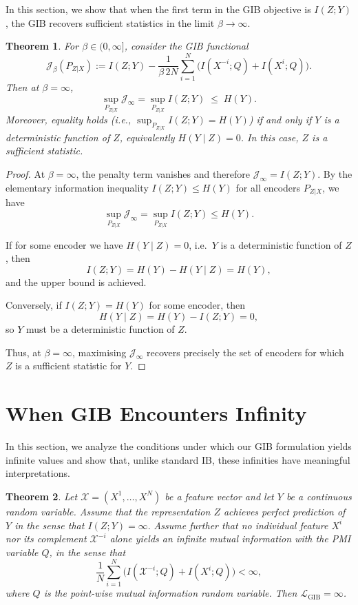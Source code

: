 \documentclass{article}
\newtheorem{theorem}{Theorem}
\theoremstyle{definition}
\theoremstyle{remark}
\begin{document}
In this section, we show that when the first term in the GIB objective is
$I(Z;Y)$, the GIB recovers sufficient statistics in the limit 
$\beta \to \infty$.

\begin{theorem}
For $\beta\in(0,\infty]$, consider the GIB functional
\[
\mathcal{J}_\beta(P_{Z|X})
:= I(Z;Y)
- \frac{1}{\beta\,2N}\sum_{i=1}^N 
\Big( I(X^{-i};Q) + I(X^{i};Q) \Big).
\]
Then at $\beta=\infty$,
\[
\sup_{P_{Z|X}} \mathcal{J}_\infty
= \sup_{P_{Z|X}} I(Z;Y)
\;\le\; H(Y).
\]
Moreover, equality holds (i.e., $\sup_{P_{Z|X}} I(Z;Y)=H(Y)$) if and only if
$Y$ is a deterministic function of $Z$, equivalently $H(Y\mid Z)=0$.
In this case, $Z$ is a sufficient statistic.
\end{theorem}

\begin{proof}
At $\beta=\infty$, the penalty term vanishes and therefore
$\mathcal{J}_\infty = I(Z;Y)$.  
By the elementary information inequality
$I(Z;Y) \le H(Y)$ for all encoders $P_{Z|X}$, we have
\[
\sup_{P_{Z|X}} \mathcal{J}_\infty
= \sup_{P_{Z|X}} I(Z;Y)
\le H(Y).
\]

If for some encoder we have $H(Y\mid Z)=0$, i.e.\ $Y$ is a deterministic 
function of $Z$, then
\[
I(Z;Y) = H(Y) - H(Y\mid Z) = H(Y),
\]
and the upper bound is achieved.

Conversely, if $I(Z;Y)=H(Y)$ for some encoder, then
\[
H(Y\mid Z) = H(Y) - I(Z;Y) = 0,
\]
so $Y$ must be a deterministic function of $Z$.

Thus, at $\beta=\infty$, maximising $\mathcal{J}_\infty$ recovers precisely
the set of encoders for which $Z$ is a sufficient statistic for $Y$.
\end{proof}



\section{When GIB Encounters Infinity}
\label{app:infinite_gib}
In this section, we analyze the conditions under which our GIB formulation 
yields infinite values and show that, unlike standard IB, these infinities 
have meaningful interpretations.

\begin{theorem}
Let $\mathcal{X} = (X^1,\dots,X^N)$ be a feature vector and let $Y$ be a continuous random variable.
Assume that the representation $Z$ achieves perfect prediction of $Y$ in the
sense that $I(Z;Y) = \infty.$ Assume further that no individual feature $X^i$ nor its complement
$\mathcal{X}^{-i}$ alone yields an infinite mutual information with the PMI
variable $Q$, in the sense that
\[
\frac{1}{N}\sum_{i=1}^{N} 
\Big(I(\mathcal{X}^{-i}; Q) + I(X^{i}; Q)\Big) 
< \infty,
\]
where $Q$ is the point-wise mutual information random variable.
Then $\mathcal{L}_{\mathrm{GIB}} = \infty$.
\end{theorem}
\end{document}
